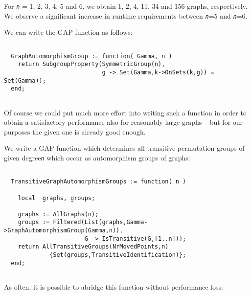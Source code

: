 \documentclass[a4paper,11pt]{report}
\begin{document}
{{\begin{description}
\begin{Verbatim}[fontsize=\small,frame=single,label=GAP code]
\end{Verbatim}
 For \mbox{\texttt{\mdseries\slshape n}} = 1, 2, 3, 4, 5 and 6, we obtain 1, 2, 4, 11, 34 and 156 graphs, respectively.
We observe a significant increase in runtime requirements between \mbox{\texttt{\mdseries\slshape n}}{\nobreakspace}={\nobreakspace}5 and \mbox{\texttt{\mdseries\slshape n}}{\nobreakspace}={\nobreakspace}6. 
\item[{ad b)}]  We can write the \textsf{GAP} function as follows:   
\begin{Verbatim}[fontsize=\small,frame=single,label=GAP code]
  
  GraphAutomorphismGroup := function( Gamma, n )
    return SubgroupProperty(SymmetricGroup(n),
                            g -> Set(Gamma,k->OnSets(k,g)) = Set(Gamma));
  end;
  
\end{Verbatim}
 Of course we could put much more effort into writing such a function in order
to obtain a satisfactory performance also for reasonably large graphs -- but
for our purposes the given one is already good enough. 
\item[{ad c)}]  We write a \textsf{GAP} function which determines all transitive permutation groups of given
degree{\nobreakspace}\mbox{\texttt{\mdseries\slshape n}} which occur as automorphism groups of graphs:        
\begin{Verbatim}[fontsize=\small,frame=single,label=GAP code]
  
  TransitiveGraphAutomorphismGroups := function( n )
  
    local  graphs, groups; 
  
    graphs := AllGraphs(n);
    groups := Filtered(List(graphs,Gamma->GraphAutomorphismGroup(Gamma,n)),
                       G -> IsTransitive(G,[1..n]));
    return AllTransitiveGroups(NrMovedPoints,n)
             {Set(groups,TransitiveIdentification)};
  end;
  
\end{Verbatim}
 As often, it is possible to abridge this function without performance loss: 
\begin{Verbatim}[fontsize=\small,frame=single,label=GAP code]
  

\end{Verbatim}
\end{description}}}
\end{document}
